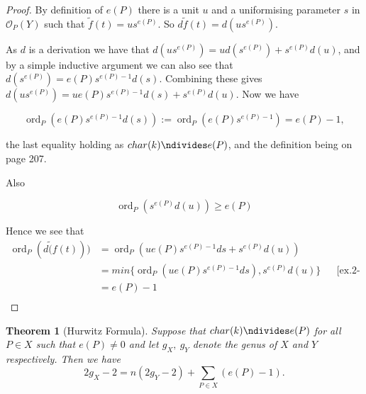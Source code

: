 \documentclass[11pt]{article} %
\newtheorem{thm}{Theorem}
\DeclareMathOperator{\ord}{ord}
\begin{document}
\begin{proof}
	By definition of $e(P)$ there is a unit $u$ and a uniformising parameter $s$ in $\mathscr{O}_{P}(Y)$ such that 			$\tilde{f}(t)=us^{e(P)}$. So $d\tilde{f}(t)=d(us^{e(P)})$.

	As $d$ is a derivation we have that $d(us^{e(P)})=ud(s^{e(P)})+s^{e(P)}d(u)$, and by a simple inductive 			argument we can also see that $d(s^{e(P)})=e(P)s^{e(P)-1}d(s)$. Combining these gives 					$d(us^{e(P)})=ue(P)s^{e(P)-1}d(s)+s^{e(P)}d(u)$. Now we have

		\begin{equation}
			\ord_{P}(e(P)s^{e(P)-1}d(s)):= \ord_{P}(e(P)s^{e(P)-1})=e(P)-1,
		\end{equation}

	the last equality holding as $char(k)\ndivides e(P)$, and the definition being on page 207.

	Also

		\begin{equation}
			\ord_{P}(s^{e(P)}d(u))\geq e(P)
		\end{equation}

	

	Hence we see that
		\begin{align*}
			\ord_{P}(d\tilde({f}(t))) & = \ord_{P}(ue(P)s^{e(P)-1}ds+s^{e(P)}d(u)) \\
			& =  min\{ \ord_{P}(ue(P)s^{e(P)-1}ds),s^{e(P)}d(u) \} && \mbox{[ex.2-29, p.48]}\\
			& = e(P)-1 \\
		\end{align*}

\end{proof}

\begin{thm}[Hurwitz Formula]
	Suppose that $char(k)\ndivides e(P)$ for all $P\in X$ such that $e(P)\neq 0$ and let $g_{X},\ g_{Y}$ denote the 		genus of $X$ and $Y$ respectively. Then we have
		\begin{equation*}
			2g_{X}-2=n(2g_{Y}-2)+\sum_{P\in X}(e(P)-1).
		\end{equation*}
\end{thm}
\end{document}
